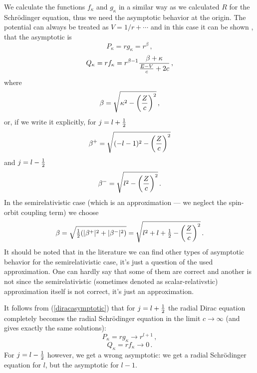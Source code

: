 We calculate the functions $f_\kappa$ and $g_\kappa$ in a similar way as we calculated $R$ for the Schrödinger equation, thus we need the asymptotic behavior at the origin. The potential can always be treated as $V=1/r+\cdots$ and in this case it can be shown \cite{zabloudil}, that the asymptotic is 
\begin{equation*}
  P_\kappa = r g_\kappa=r^{\beta}\,,
\end{equation*}
\begin{equation*}
  Q_\kappa = r f_\kappa=r^{\beta-1}{\beta+\kappa\over{E-V\over c}+2c}\,,
\end{equation*}
where 
\begin{equation}
  \beta=\sqrt{\kappa^2-\left(Z\over c\right)^2}\,,  \label{diracasymptotic}
\end{equation}
or, if we write it explicitly, for $j=l+{\textstyle{1\over2}}$
\begin{equation*}
  \beta^+=\sqrt{(-l-1)^2-\left(Z\over c\right)^2}
\end{equation*}
and $j=l-{\textstyle{1\over2}}$
\begin{equation*}
  \beta^-=\sqrt{l^2-\left(Z\over c\right)^2}\,.
\end{equation*}
In the semirelativistic case (which is an approximation --- we neglect the spin-orbit coupling term) we choose 
\begin{equation*}
  \beta=\sqrt{{\textstyle{1\over2}}(|\beta^+|^2+|\beta^-|^2)}= \sqrt{l^2+l+{\textstyle{1\over2}}-\left(Z\over c\right)^2}\,.
\end{equation*}
It should be noted that in the literature we can find other types of asymptotic behavior for the semirelativistic case, it's just a question of the used approximation. One can hardly say that some of them are correct and another is not since the semirelativistic (sometimes denoted as scalar-relativstic) approximation itself is not correct, it's just an approximation.

It follows from (\ref{diracasymptotic}) that for $j=l+{\textstyle{1\over2}}$ the radial Dirac equation completely becomes the radial Schrödinger equation in the limit $c\to\infty$ (and gives exactly the same solutions): 
\begin{equation*}
  P_\kappa = r g_\kappa \to r^{l+1}\,,
\end{equation*}
\begin{equation*}
  Q_\kappa = r f_\kappa \to 0\,.
\end{equation*}
For $j=l-{\textstyle{1\over2}}$ however, we get a wrong asymptotic: we get a radial Schrödinger equation for $l$, but the asymptotic for $l-1$.

